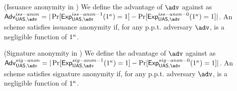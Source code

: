 \begin{figure*}[htp!]
  \centering
  \caption{Issuance and signature anonymity experiments for \UAS schemes.}
  \label{fig:exp-uas-anonb}
\end{figure*}

\begin{definition}{(Issuance anonymity in \UAS)}
  \label{def:issue-anonymity-uas}  
  We define the advantage \AdvIssAnon of $\adv$ against \ExpIssAnonb as
  $\AdvIssAnon=|\Pr\lbrack\ExpIssAnono(1^\secpar)=1\rbrack-
  \Pr\lbrack\ExpIssAnonz(1^\secpar)=1\rbrack|$.
  An \UAS scheme satisfies issuance anonymity if, for any p.p.t. adversary
  $\adv$, \AdvIssAnon is a negligible function of $1^\kappa$.
\end{definition}

\begin{definition}{(Signature anonymity in \UAS)}
  \label{def:sign-anonymity-uas}  
  We define the advantage \AdvSigAnon of $\adv$ against \ExpSigAnonb as
  $\AdvSigAnon=|\Pr\lbrack\ExpSigAnono(1^\secpar)=1\rbrack-
  \Pr\lbrack\ExpSigAnonz(1^\secpar)=1\rbrack|$.
  An \UAS scheme satisfies signature anonymity if, for any p.p.t. adversary
  $\adv$, \AdvSigAnon is a negligible function of $1^\kappa$.
\end{definition}

